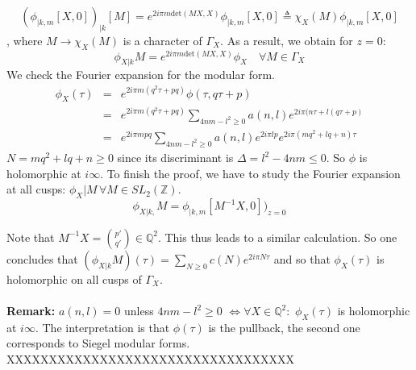 \documentclass[10pt,a4paper]{article}
\begin{document}
\[(\phi_{|k,m}[X,0])_{|k}[M]=e^{2i\pi m\textrm{det}(MX,X)}\phi_{|k,m}[X,0]\triangleq\chi_X(M)\phi_{|k,m}[X,0]\]
, where $M\rightarrow\chi_X(M)$ is a character of $\Gamma_X$. As a result, we obtain for $z=0$:
\[\phi_{X|k}M=e^{2i\pi m\textrm{det}(MX,X)}\phi_X\quad\forall M\in\Gamma_X\]
We check the Fourier expansion for the modular form.
\begin{eqnarray*}
\phi_X(\tau)&=&e^{2i\pi m(q^2\tau+pq)}\phi(\tau,q\tau+p)\\
&=&e^{2i\pi m(q^2\tau+pq)}\sum_{4nm-l^2\geq0}a(n,l)e^{2i\pi(n\tau+l(q\tau+p)}\\
&=&e^{2i\pi mpq}\sum_{4nm-l^2\geq0} a(n,l)e^{2i\pi lp}e^{2i\pi(mq^2+lq+n)\tau}
\end{eqnarray*}
$N=mq^2+lq+n\geq0$ since its discriminant is $\Delta=l^2-4nm\leq0$. So $\phi$ is holomorphic at $i\infty$.
To finish the proof, we have to study the Fourier expansion at all cusps: $\phi_X|M\,\forall M\in SL_2(\mathbb{Z})$.
\[\phi_{X|k,}M=\phi_{|k,m}[M^{-1}X,0])_{z=0}\]

Note that $M^{-1}X=\binom{p'}{q'}\in\mathbb{Q}^2$. This thus leads to a similar calculation. So one concludes that $(\phi_{X|k}M)(\tau)=\sum_{N\geq0}c(N)e^{2i\pi N\tau}$ and so that $\phi_X(\tau)$ is holomorphic on all cusps of $\Gamma_X$.
\\
\\
\textbf{Remark:} $a(n,l)=0$ unless $4nm-l^2\geq0$ $\iff\forall X\in\mathbb{Q}^2:$ $\phi_X(\tau)$ is holomorphic at $i\infty$. The interpretation is that $\phi(\tau)$ is the pullback, the second one corresponds to Siegel modular forms. XXXXXXXXXXXXXXXXXXXXXXXXXXXXXXXXXX
\end{document}
